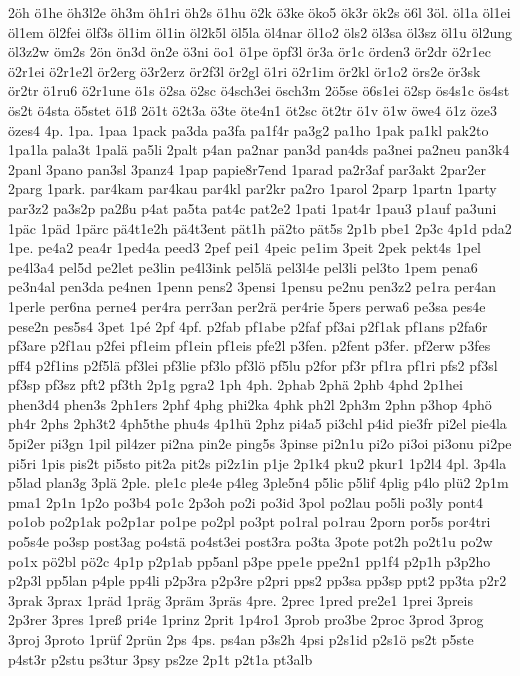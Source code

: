 {2öh
ö1he
öh3l2e
öh3m
öh1ri
öh2s
ö1hu
ö2k
ö3ke
öko5
ök3r
ök2s
ö6l
3öl.
öl1a
öl1ei
öl1em
öl2fei
ölf3s
öl1im
öl1in
öl2k5l
öl5la
öl4nar
öl1o2
öls2
öl3sa
öl3sz
öl1u
öl2ung
öl3z2w
öm2s
2ön
ön3d
ön2e
ö3ni
öo1
ö1pe
öpf3l
ör3a
ör1c
örden3
ör2dr
ö2r1ec
ö2r1ei
ö2r1e2l
ör2erg
ö3r2erz
ör2f3l
ör2gl
ö1ri
ö2r1im
ör2kl
ör1o2
örs2e
ör3sk
ör2tr
ö1ru6
ö2r1une
ö1s
ö2sa
ö2sc
ö4sch3ei
ösch3m
2ö5se
ö6s1ei
ö2sp
ös4s1c
ös4st
ös2t
ö4sta
ö5stet
ö1ß
2ö1t
ö2t3a
ö3te
öte4n1
öt2sc
öt2tr
ö1v
ö1w
öwe4
ö1z
öze3
özes4
4p.
1pa.
1paa
1pack
pa3da
pa3fa
pa1f4r
pa3g2
pa1ho
1pak
pa1kl
pak2to
1pa1la
pala3t
1palä
pa5li
2palt
p4an
pa2nar
pan3d
pan4ds
pa3nei
pa2neu
pan3k4
2panl
3pano
pan3sl
3panz4
1pap
papie8r7end
1parad
pa2r3af
par3akt
2par2er
2parg
1park.
par4kam
par4kau
par4kl
par2kr
pa2ro
1parol
2parp
1partn
1party
par3z2
pa3s2p
pa2ßu
p4at
pa5ta
pat4c
pat2e2
1pati
1pat4r
1pau3
p1auf
pa3uni
1päc
1päd
1pärc
pä4t1e2h
pä4t3ent
pät1h
pä2to
pät5s
2p1b
pbe1
2p3c
4p1d
pda2
1pe.
pe4a2
pea4r
1ped4a
peed3
2pef
pei1
4peic
pe1im
3peit
2pek
pekt4s
1pel
pe4l3a4
pel5d
pe2let
pe3lin
pe4l3ink
pel5lä
pel3l4e
pel3li
pel3to
1pem
pena6
pe3n4al
pen3da
pe4nen
1penn
pens2
3pensi
1pensu
pe2nu
pen3z2
pe1ra
per4an
1perle
per6na
perne4
per4ra
perr3an
per2rä
per4rie
5pers
perwa6
pe3sa
pes4e
pese2n
pes5s4
3pet
1pé
2pf
4pf.
p2fab
pf1abe
p2faf
pf3ai
p2f1ak
pf1ans
p2fa6r
pf3are
p2f1au
p2fei
pf1eim
pf1ein
pf1eis
pfe2l
p3fen.
p2fent
p3fer.
pf2erw
p3fes
pff4
p2f1ins
p2f5lä
pf3lei
pf3lie
pf3lo
pf3lö
pf5lu
p2for
pf3r
pf1ra
pf1ri
pfs2
pf3sl
pf3sp
pf3sz
pft2
pf3th
2p1g
pgra2
1ph
4ph.
2phab
2phä
2phb
4phd
2p1hei
phen3d4
phen3s
2ph1ers
2phf
4phg
phi2ka
4phk
ph2l
2ph3m
2phn
p3hop
4phö
ph4r
2phs
2ph3t2
4ph5the
phu4s
4p1hü
2phz
pi4a5
pi3chl
p4id
pie3fr
pi2el
pie4la
5pi2er
pi3gn
1pil
pil4zer
pi2na
pin2e
ping5s
3pinse
pi2n1u
pi2o
pi3oi
pi3onu
pi2pe
pi5ri
1pis
pis2t
pi5sto
pit2a
pit2s
pi2z1in
p1je
2p1k4
pku2
pkur1
1p2l4
4pl.
3p4la
p5lad
plan3g
3plä
2ple.
ple1c
ple4e
p4leg
3ple5n4
p5lic
p5lif
4plig
p4lo
plü2
2p1m
pma1
2p1n
1p2o
po3b4
po1c
2p3oh
po2i
po3id
3pol
po2lau
po5li
po3ly
pont4
po1ob
po2p1ak
po2p1ar
po1pe
po2pl
po3pt
po1ral
po1rau
2porn
por5s
por4tri
po5s4e
po3sp
post3ag
po4stä
po4st3ei
post3ra
po3ta
3pote
pot2h
po2t1u
po2w
po1x
pö2bl
pö2c
4p1p
p2p1ab
pp5anl
p3pe
ppe1e
ppe2n1
pp1f4
p2p1h
p3p2ho
p2p3l
pp5lan
p4ple
pp4li
p2p3ra
p2p3re
p2pri
pps2
pp3sa
pp3sp
ppt2
pp3ta
p2r2
3prak
3prax
1präd
1präg
3präm
3präs
4pre.
2prec
1pred
pre2e1
1prei
3preis
2p3rer
3pres
1preß
pri4e
1prinz
2prit
1p4ro1
3prob
pro3be
2proc
3prod
3prog
3proj
3proto
1prüf
2prün
2ps
4ps.
ps4an
p3s2h
4psi
p2s1id
p2s1ö
ps2t
p5ste
p4st3r
p2stu
ps3tur
3psy
ps2ze
2p1t
p2t1a
pt3alb
}
